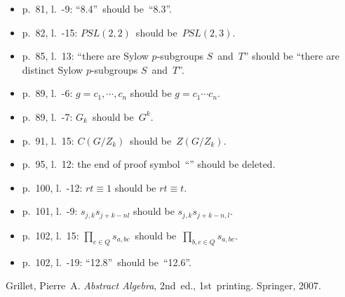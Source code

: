\documentclass[letterpaper,12pt]{article}
\begin{document}
\begin{itemize}
\item p.~81, l.~-9: ``8.4''~should be~``8.3''.
\item p.~82, l.~-15: \(PSL(2,2)\)~should be~\(PSL(2,3)\).
\item p.~85, l.~13: ``there are Sylow \(p\)-subgroups \(S\)~and~\(T\)'' should be ``there are distinct Sylow \(p\)-subgroups \(S\)~and~\(T\)''.
\item p.~89, l.~-6: \(g=c_1,\cdots,c_n\) should be \(g=c_1\cdots c_n\).
\item p.~89, l.~-7: \(G_k\)~should be~\(G^k\).
\item p.~91, l.~15: \(C(G/Z_k)\)~should be~\(Z(G/Z_k)\).
\item p.~95, l.~12: the end of proof symbol~``\qedsymbol'' should be deleted.
\item p.~100, l.~-12: \(rt\equiv 1\) should be \(rt\equiv t\).
\item p.~101, l.~-9: \(s_{j,k}s_{j+k-nl}\) should be \(s_{j,k}s_{j+k-n,l}\).
\item p.~102, l.~15: \(\prod_{c\in Q}s_{a,bc}\)~should be~\(\prod_{b,c\in Q}s_{a,bc}\).
\item p.~102, l.~-19: ``12.8''~should be~``12.6''.
\end{itemize}

\begin{thebibliography}{0}
 Grillet, Pierre~A. \textit{Abstract Algebra}, 2nd~ed., 1st~printing. Springer, 2007.
\end{thebibliography}
\end{document}

